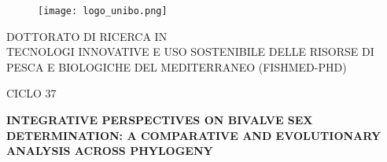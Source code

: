 
{
    \textwidth=450pt

    \begin{titlepage}

    \begin{center}

    \begin{figure}[h]
        \centering
        \texttt{[image: logo\_unibo.png]}
        \label{fig:logo}
    \end{figure}

    {{\large{\textsc{DOTTORATO DI RICERCA IN}} \\
    TECNOLOGI INNOVATIVE E USO SOSTENIBILE DELLE RISORSE DI PESCA E BIOLOGICHE DEL MEDITERRANEO (FISHMED-PHD)}} 
    \vspace{5mm}

    {\large{CICLO 37}}
    \vspace{5mm}
    \end{center}

    {}

    \vspace{15mm}

    \begin{center} {

        {\LARGE{\bf INTEGRATIVE PERSPECTIVES ON BIVALVE SEX DETERMINATION: A COMPARATIVE AND EVOLUTIONARY ANALYSIS ACROSS PHYLOGENY}}\\




    }\end{center}

    \vspace{15mm} \par \noindent


\end{titlepage}}
